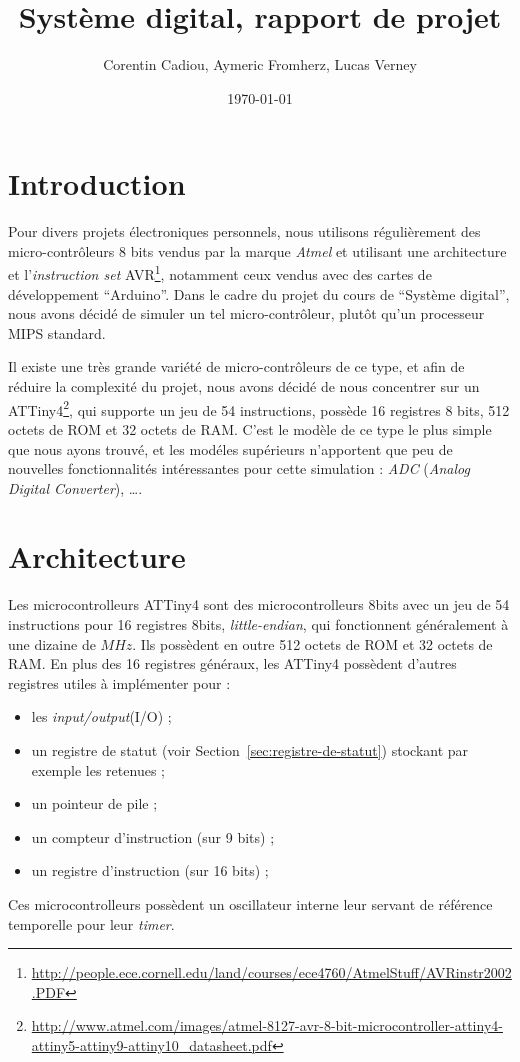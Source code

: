 \documentclass[11pt]{article}
\author{Corentin Cadiou, Aymeric Fromherz, Lucas Verney}
\date{\today}
\title{Système digital, rapport de projet}
\begin{document}
\maketitle
\section*{Introduction}
Pour divers projets électroniques personnels, nous utilisons régulièrement des micro-contrôleurs 8 bits vendus par la marque \emph{Atmel} et utilisant une architecture et l'\emph{instruction set} AVR\footnote{\url{http://people.ece.cornell.edu/land/courses/ece4760/AtmelStuff/AVRinstr2002.PDF}}, notamment ceux vendus avec des cartes de développement ``Arduino''. Dans le cadre du projet du cours de ``Système digital'', nous avons décidé de simuler un tel micro-contrôleur, plutôt qu'un processeur MIPS standard.

Il existe une très grande variété de micro-contrôleurs de ce type, et afin de réduire la complexité du projet, nous avons décidé de nous concentrer sur un ATTiny4\footnote{\url{http://www.atmel.com/images/atmel-8127-avr-8-bit-microcontroller-attiny4-attiny5-attiny9-attiny10_datasheet.pdf}}, qui supporte un jeu de 54 instructions, possède 16 registres 8 bits, 512 octets de ROM et 32 octets de RAM. C'est le modèle de ce type le plus simple que nous ayons trouvé, et les modéles supérieurs n'apportent que peu de nouvelles fonctionnalités intéressantes pour cette simulation : \emph{ADC} (\emph{Analog Digital Converter}), \dots.

\section{Architecture}
Les microcontrolleurs ATTiny4 sont des microcontrolleurs 8bits avec un
jeu de 54 instructions pour 16 registres 8bits, \emph{little-endian}, qui
fonctionnent généralement à une dizaine de $MHz$. Ils possèdent en
outre 512 octets de ROM et 32 octets de RAM. En plus des 16 registres
généraux, les ATTiny4 possèdent d'autres registres utiles à implémenter pour :
\begin{itemize}
  \item les \emph{input/output}(I/O) ;
  \item un registre de statut (voir
    Section~\ref{sec:registre-de-statut}) stockant par exemple les
    retenues ;
  \item un pointeur de pile ;
  \item un compteur d'instruction (sur 9 bits) ;
  \item un registre d'instruction (sur 16 bits) ;
\end{itemize}
Ces microcontrolleurs possèdent un oscillateur interne leur servant de
référence temporelle pour leur \emph{timer}.
\end{document}
